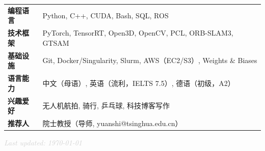 \documentclass[10pt, letterpaper]{article}
\begin{document}
\begin{tabularx}{\linewidth}{@{}>{\bfseries\small}p{2.5cm}X@{}}
编程语言 & Python, C++, CUDA, Bash, SQL, ROS \\

技术框架 & PyTorch, TensorRT, Open3D, OpenCV, PCL, ORB-SLAM3, GTSAM \\[1.5pt]

基础设施 & Git, Docker/Singularity, Slurm, AWS（EC2/S3）, Weights \& Biases \\[1.5pt]

语言能力 & 中文（母语）, 英语（流利，IELTS 7.5）, 德语（初级，A2） \\[1.5pt]

兴趣爱好 & 无人机航拍, 骑行, 乒乓球, 科技博客写作 \\

推荐人 & 院士教授（导师, yuanshi@tsinghua.edu.cn） \\
\end{tabularx}

\vspace{8pt}
\noindent\textcolor{lightgray}{\footnotesize\textit{Last updated: \today}}
\end{document}
